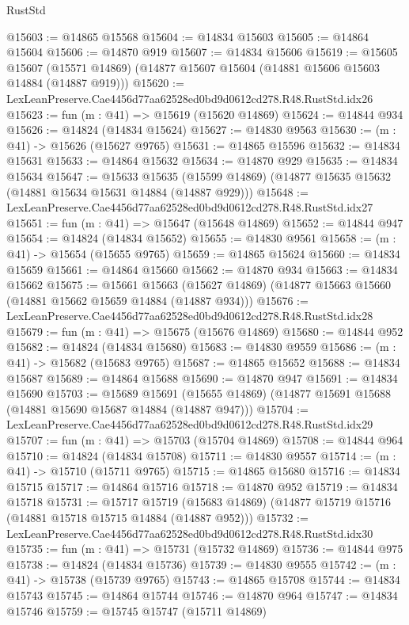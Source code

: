 \begin{lexlean}{RustStd}
\begin{coremodule}
@15603 := @14865 @15568
@15604 := @14834 @15603
@15605 := @14864 @15604
@15606 := @14870 @919
@15607 := @14834 @15606
@15619 := @15605
    @15607
    (@15571 @14869)
    (@14877 @15607 @15604 (@14881 @15606 @15603 @14884 (@14887 @919)))
@15620 := LexLeanPreserve.Cae4456d77aa62528ed0bd9d0612cd278.R48.RustStd.idx26
@15623 := fun (m : @41) => @15619 (@15620 @14869)
@15624 := @14844 @934
@15626 := @14824 (@14834 @15624)
@15627 := @14830 @9563
@15630 := (m : @41) -> @15626 (@15627 @9765)
@15631 := @14865 @15596
@15632 := @14834 @15631
@15633 := @14864 @15632
@15634 := @14870 @929
@15635 := @14834 @15634
@15647 := @15633
    @15635
    (@15599 @14869)
    (@14877 @15635 @15632 (@14881 @15634 @15631 @14884 (@14887 @929)))
@15648 := LexLeanPreserve.Cae4456d77aa62528ed0bd9d0612cd278.R48.RustStd.idx27
@15651 := fun (m : @41) => @15647 (@15648 @14869)
@15652 := @14844 @947
@15654 := @14824 (@14834 @15652)
@15655 := @14830 @9561
@15658 := (m : @41) -> @15654 (@15655 @9765)
@15659 := @14865 @15624
@15660 := @14834 @15659
@15661 := @14864 @15660
@15662 := @14870 @934
@15663 := @14834 @15662
@15675 := @15661
    @15663
    (@15627 @14869)
    (@14877 @15663 @15660 (@14881 @15662 @15659 @14884 (@14887 @934)))
@15676 := LexLeanPreserve.Cae4456d77aa62528ed0bd9d0612cd278.R48.RustStd.idx28
@15679 := fun (m : @41) => @15675 (@15676 @14869)
@15680 := @14844 @952
@15682 := @14824 (@14834 @15680)
@15683 := @14830 @9559
@15686 := (m : @41) -> @15682 (@15683 @9765)
@15687 := @14865 @15652
@15688 := @14834 @15687
@15689 := @14864 @15688
@15690 := @14870 @947
@15691 := @14834 @15690
@15703 := @15689
    @15691
    (@15655 @14869)
    (@14877 @15691 @15688 (@14881 @15690 @15687 @14884 (@14887 @947)))
@15704 := LexLeanPreserve.Cae4456d77aa62528ed0bd9d0612cd278.R48.RustStd.idx29
@15707 := fun (m : @41) => @15703 (@15704 @14869)
@15708 := @14844 @964
@15710 := @14824 (@14834 @15708)
@15711 := @14830 @9557
@15714 := (m : @41) -> @15710 (@15711 @9765)
@15715 := @14865 @15680
@15716 := @14834 @15715
@15717 := @14864 @15716
@15718 := @14870 @952
@15719 := @14834 @15718
@15731 := @15717
    @15719
    (@15683 @14869)
    (@14877 @15719 @15716 (@14881 @15718 @15715 @14884 (@14887 @952)))
@15732 := LexLeanPreserve.Cae4456d77aa62528ed0bd9d0612cd278.R48.RustStd.idx30
@15735 := fun (m : @41) => @15731 (@15732 @14869)
@15736 := @14844 @975
@15738 := @14824 (@14834 @15736)
@15739 := @14830 @9555
@15742 := (m : @41) -> @15738 (@15739 @9765)
@15743 := @14865 @15708
@15744 := @14834 @15743
@15745 := @14864 @15744
@15746 := @14870 @964
@15747 := @14834 @15746
@15759 := @15745
    @15747
    (@15711 @14869)

\end{coremodule}
\end{lexlean}
